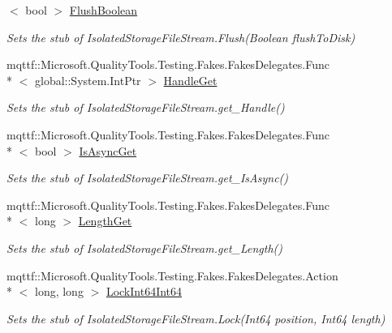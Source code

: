 \begin{DoxyCompactItemize}
$<$ bool $>$ \hyperlink{class_system_1_1_i_o_1_1_isolated_storage_1_1_fakes_1_1_stub_isolated_storage_file_stream_ace055f020367c77fa2ee973452b58f9f}{Flush\-Boolean}
\begin{DoxyCompactList}\small\item\em Sets the stub of Isolated\-Storage\-File\-Stream.\-Flush(\-Boolean flush\-To\-Disk)\end{DoxyCompactList}\item 
mqttf\-::\-Microsoft.\-Quality\-Tools.\-Testing.\-Fakes.\-Fakes\-Delegates.\-Func\\*
$<$ global\-::\-System.\-Int\-Ptr $>$ \hyperlink{class_system_1_1_i_o_1_1_isolated_storage_1_1_fakes_1_1_stub_isolated_storage_file_stream_a58542ae10e292c8652e544857731eb1c}{Handle\-Get}
\begin{DoxyCompactList}\small\item\em Sets the stub of Isolated\-Storage\-File\-Stream.\-get\-\_\-\-Handle()\end{DoxyCompactList}\item 
mqttf\-::\-Microsoft.\-Quality\-Tools.\-Testing.\-Fakes.\-Fakes\-Delegates.\-Func\\*
$<$ bool $>$ \hyperlink{class_system_1_1_i_o_1_1_isolated_storage_1_1_fakes_1_1_stub_isolated_storage_file_stream_a8754a83e31d04aec9abff8825a748b49}{Is\-Async\-Get}
\begin{DoxyCompactList}\small\item\em Sets the stub of Isolated\-Storage\-File\-Stream.\-get\-\_\-\-Is\-Async()\end{DoxyCompactList}\item 
mqttf\-::\-Microsoft.\-Quality\-Tools.\-Testing.\-Fakes.\-Fakes\-Delegates.\-Func\\*
$<$ long $>$ \hyperlink{class_system_1_1_i_o_1_1_isolated_storage_1_1_fakes_1_1_stub_isolated_storage_file_stream_a4696a1051aec9b9c3f139f9098a0118d}{Length\-Get}
\begin{DoxyCompactList}\small\item\em Sets the stub of Isolated\-Storage\-File\-Stream.\-get\-\_\-\-Length()\end{DoxyCompactList}\item 
mqttf\-::\-Microsoft.\-Quality\-Tools.\-Testing.\-Fakes.\-Fakes\-Delegates.\-Action\\*
$<$ long, long $>$ \hyperlink{class_system_1_1_i_o_1_1_isolated_storage_1_1_fakes_1_1_stub_isolated_storage_file_stream_a721cdf71e55cc7a133e50421712ff5fc}{Lock\-Int64\-Int64}
\begin{DoxyCompactList}\small\item\em Sets the stub of Isolated\-Storage\-File\-Stream.\-Lock(\-Int64 position, Int64 length)\end{DoxyCompactList}\item 

\end{DoxyCompactItemize}
